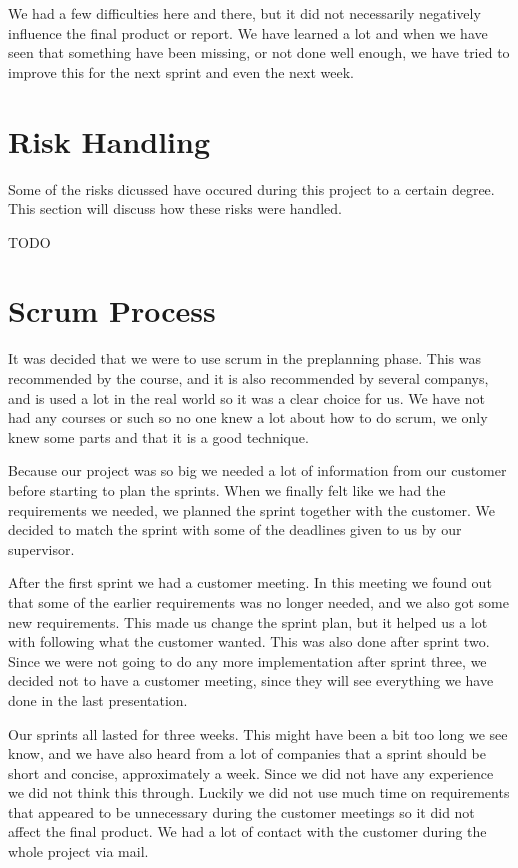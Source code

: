 \documentclass{report}
\begin{document}
We had a few difficulties here and there, but it did not necessarily negatively influence the final product or report. We have learned a lot and when we have seen that something have been missing, or not done well enough, we have tried to improve this for the next sprint and even the next week.


\newpage
\section{Risk Handling} \label{sec:risk_handling}
Some of the risks dicussed have occured during this project to a certain degree. This section will discuss how these risks were handled.

TODO
\newpage
\section{Scrum Process} \label{sec:scrum_process}
It was decided that we were to use scrum in the preplanning phase. This was recommended by the course, and it is also recommended by several companys, and is used a lot in the real world so it was a clear choice for us. We have not had any courses or such so no one knew a lot about how to do scrum, we only knew some parts and that it is a good technique.

Because our project was so big we needed a lot of information from our customer before starting to plan the sprints. When we finally felt like we had the requirements we needed, we planned the sprint together with the customer. We decided to match the sprint with some of the deadlines given to us by our supervisor.

After the first sprint we had a customer meeting. In this meeting we found out that some of the earlier requirements was no longer needed, and we also got some new requirements. This made us change the sprint plan, but it helped us a lot with following what the customer wanted. This was also done after sprint two. Since we were not going to do any more implementation after sprint three, we decided not to have a customer meeting, since they will see everything we have done in the last presentation.

Our sprints all lasted for three weeks. This might have been a bit too long we see know, and we have also heard from a lot of companies that a sprint should be short and concise, approximately a week. Since we did not have any experience we did not think this through. Luckily we did not use much time on requirements that appeared to be unnecessary during the customer meetings so it did not affect the final product. We had a lot of contact with the customer during the whole project via mail.
\end{document}
